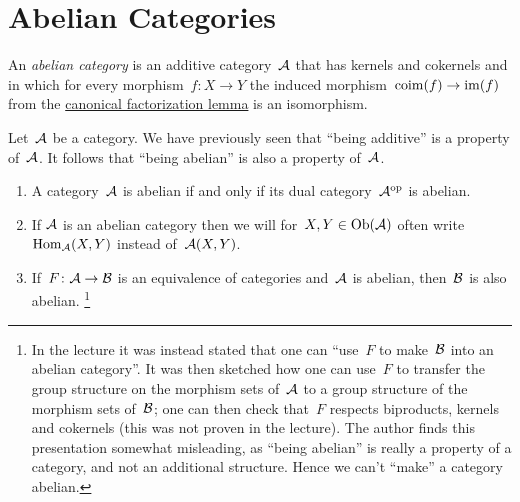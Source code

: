 \section{Abelian Categories}


\begin{definition}
  An \emph{abelian category} is an additive category~$\mathcal{A}$ that has kernels and cokernels and in which for every morphism~$f \colon X \to Y$ the induced morphism~$\operatorname{coim}(f) \to \operatorname{im}(f)$ from the \hyperref[canonical factorization]{canonical factorization lemma} is an isomorphism.
\end{definition}


\begin{remark*}
  Let~$\mathcal{A}$ be a category.
  We have previously seen that \enquote{being additive} is a property of~$\mathcal{A}$.
  It follows that \enquote{being abelian} is also a property of~$\mathcal{A}$.
\end{remark*}


\begin{remark}
  \leavevmode
  \begin{enumerate}
    \item
      A category~$\mathcal{A}$ is abelian if and only if its dual category~$\mathcal{A}^{\mathrm{op}}$ is abelian.
    \item
      If $\mathcal{A}$ is an abelian category then we will for~$X, Y \in \operatorname{Ob}(\mathcal{A})$ often write~$\operatorname{Hom}_{\mathcal{A}}(X,Y)$ instead of~$\mathcal{A}(X,Y)$.
    \item
      If~$F \colon \mathcal{A} \to \mathcal{B}$ is an equivalence of categories and~$\mathcal{A}$ is abelian, then~$\mathcal{B}$ is also abelian.%
      \footnote{In the lecture it was instead stated that one can \enquote{use~$F$ to make~$\mathcal{B}$ into an abelian category}.
      It was then sketched how one can use~$F$ to transfer the group structure on the morphism sets of~$\mathcal{A}$ to a group structure of the morphism sets of~$\mathcal{B}$;
      one can  then check that~$F$ respects biproducts, kernels and cokernels (this was not proven in the lecture).
      The author finds this presentation somewhat misleading, as \enquote{being abelian} is really a property of a category, and not an additional structure.
      Hence we can’t \enquote{make} a category abelian.}
  \end{enumerate}
\end{remark}


